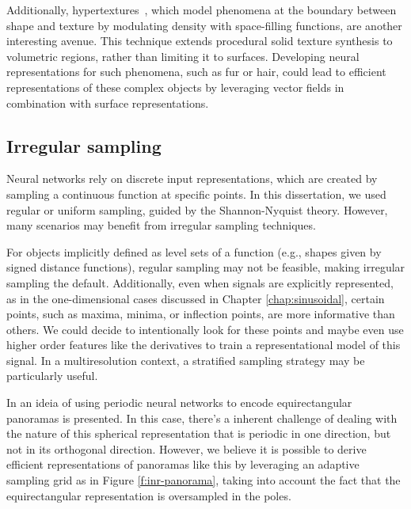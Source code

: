Additionally, hypertextures~\citep{hypertexture}, which model phenomena at the boundary between shape and texture by modulating density with space-filling functions, are another interesting avenue. This technique extends procedural solid texture synthesis to volumetric regions, rather than limiting it to surfaces. Developing neural representations for such phenomena, such as fur or hair, could lead to efficient representations of these complex objects by leveraging vector fields in combination with surface representations.


\subsection{Irregular sampling}

Neural networks rely on discrete input representations, which are created by sampling a continuous function at specific points. In this dissertation, we used regular or uniform sampling, guided by the Shannon-Nyquist theory. However, many scenarios may benefit from irregular sampling techniques.

For objects implicitly defined as level sets of a function (e.g., shapes given by signed distance functions), regular sampling may not be feasible, making irregular sampling the default. Additionally, even when signals are explicitly represented, as in the one-dimensional cases discussed in Chapter \ref{chap:sinusoidal}, certain points, such as maxima, minima, or inflection points, are more informative than others. We could decide to intentionally look for these points and maybe even use higher order features like the derivatives to train a representational model of this signal. In a multiresolution context, a stratified sampling strategy may be particularly useful. 

In \citet{spectralPoster24} an ideia of using periodic neural networks to encode equirectangular panoramas is presented. In this case, there's a inherent challenge of dealing with the nature of this spherical representation that is periodic in one direction, but not in its orthogonal direction. However, we believe it is possible to derive efficient representations of panoramas like this by leveraging an adaptive sampling grid as in Figure \ref{f:inr-panorama}, taking into account the fact that the equirectangular representation is oversampled in the poles.


